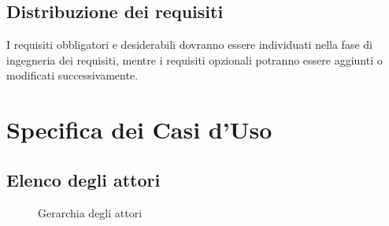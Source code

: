 \documentclass[a4paper, titlepage]{article}
\begin{document}
\subsection{Distribuzione dei requisiti}
I requisiti obbligatori e desiderabili dovranno essere individuati nella fase di ingegneria dei requisiti, mentre i requisiti opzionali potranno essere aggiunti o modificati successivamente.


\newpage

\section{Specifica dei Casi d'Uso}
\subsection{Elenco degli attori}

\begin{figure}[H]
	\centering
	\noindent{}
	\caption{Gerarchia degli attori}
\end{figure}
\end{document}
